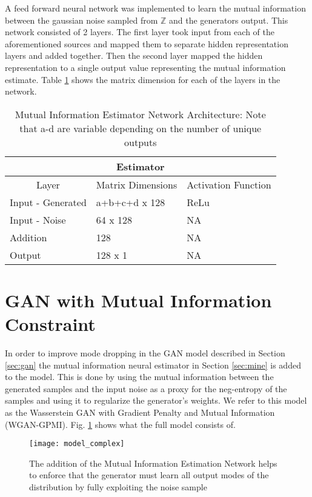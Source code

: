 A feed forward neural network was implemented to learn the mutual information between the gaussian noise sampled from $\mathbb{Z}$ and the generators output. This network consisted of 2 layers. The first layer took input from each of the aforementioned sources and mapped them to separate hidden representation layers and added together. Then the second layer mapped the hidden representation to a single output value representing the mutual information estimate. Table \ref{tab:model_mi} shows the matrix dimension for each of the layers in the network.

\begin{table}[!htbp]
	\centering
	\label{tab:model_mi}
	\caption{Mutual Information Estimator Network Architecture: Note that a-d are variable depending on the number of unique outputs}
	\begin{tabular}{l|l|l}
		\hline
		\multicolumn{3}{c}{\textbf{Estimator}} \\ 
		\hline
		\multicolumn{1}{c|}{Layer} & \multicolumn{1}{c|}{Matrix Dimensions} & \multicolumn{1}{c}{Activation Function} \\ \hline
		Input - Generated & a+b+c+d x 128 & ReLu \\
		Input - Noise & 64 x 128 & NA \\
		Addition & 128 & NA \\ 
		Output & 128 x 1 &  NA \\
		\hline
	\end{tabular}
\end{table}


\section{GAN with Mutual Information Constraint}
\label{sec:gpmi}
In order to improve mode dropping in the GAN model described in Section \ref{sec:gan} the mutual information neural estimator in Section \ref{sec:mine} is added to the model. This is done by using the mutual information between the generated samples and the input noise as a proxy for the neg-entropy of the samples and using it to regularize the generator's weights. We refer to this model as the Wasserstein GAN with Gradient Penalty and Mutual Information (WGAN-GPMI). Fig. \ref{fig:model_complex} shows what the full model consists of. 

\begin{figure}[!htbp]
	\centering%
	\texttt{[image: model\_complex]}
	\caption{
		The addition of the Mutual Information Estimation Network helps to enforce that the generator must learn all output modes of the distribution by fully exploiting the noise sample
	}
	\label{fig:model_complex}
\end{figure}

